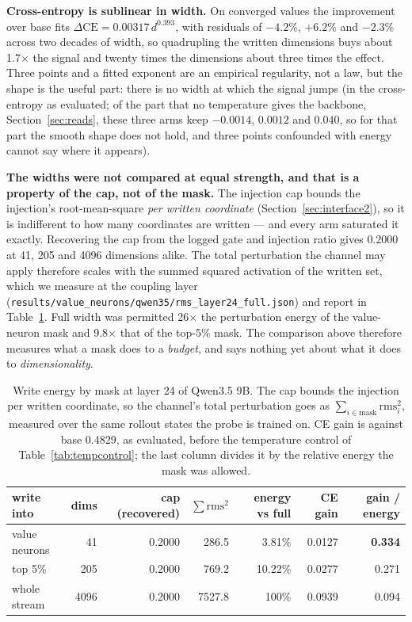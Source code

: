 \documentclass[11pt]{article}
\newcommand{\code}[1]{\texttt{#1}}
\begin{document}
\textbf{Cross-entropy is sublinear in width.} On converged values the improvement over base fits $\Delta\mathrm{CE} = 0.00317\, d^{0.393}$, with residuals of $-4.2\%$, $+6.2\%$ and $-2.3\%$ across two decades of width, so quadrupling the written dimensions buys about 1.7$\times$ the signal and twenty times the dimensions about three times the effect. Three points and a fitted exponent are an empirical regularity, not a law, but the shape is the useful part: there is no width at which the signal jumps (in the cross-entropy as evaluated; of the part that no temperature gives the backbone, Section~\ref{sec:reads}, these three arms keep $-0.0014$, $0.0012$ and $0.040$, so for that part the smooth shape does not hold, and three points confounded with energy cannot say where it appears).

\textbf{The widths were not compared at equal strength, and that is a property of the cap, not of the mask.} The injection cap bounds the injection's root-mean-square \emph{per written coordinate} (Section~\ref{sec:interface2}), so it is indifferent to how many coordinates are written --- and every arm saturated it exactly. Recovering the cap from the logged gate and injection ratio gives $0.2000$ at 41, 205 and 4096 dimensions alike. The total perturbation the channel may apply therefore scales with the summed squared activation of the written set, which we measure at the coupling layer (\code{results/value\_neurons/qwen35/rms\_layer24\_full.json}) and report in Table~\ref{tab:constenergy}. Full width was permitted 26$\times$ the perturbation energy of the value-neuron mask and 9.8$\times$ that of the top-5\% mask. The comparison above therefore measures what a mask does to a \emph{budget}, and says nothing yet about what it does to \emph{dimensionality}.

\begin{table}[t]
\centering
\caption{Write energy by mask at layer 24 of Qwen3.5 9B. The cap bounds the injection per written coordinate, so the channel's total perturbation goes as $\sum_{i \in \mathrm{mask}} \mathrm{rms}_i^2$, measured over the same rollout states the probe is trained on. CE gain is against base 0.4829, as evaluated, before the temperature control of Table~\ref{tab:tempcontrol}; the last column divides it by the relative energy the mask was allowed.}
\label{tab:constenergy}
\small
\begin{tabular}{lrrrrrr}
\toprule
write into & dims & cap (recovered) & $\sum \mathrm{rms}^2$ & energy vs full & CE gain & gain / energy \\
\midrule
value neurons & 41 & 0.2000 & 286.5 & 3.81\% & 0.0127 & \textbf{0.334} \\
top 5\% & 205 & 0.2000 & 769.2 & 10.22\% & 0.0277 & 0.271 \\
whole stream & 4096 & 0.2000 & 7527.8 & 100\% & 0.0939 & 0.094 \\
\bottomrule
\end{tabular}
\end{table}
\end{document}
